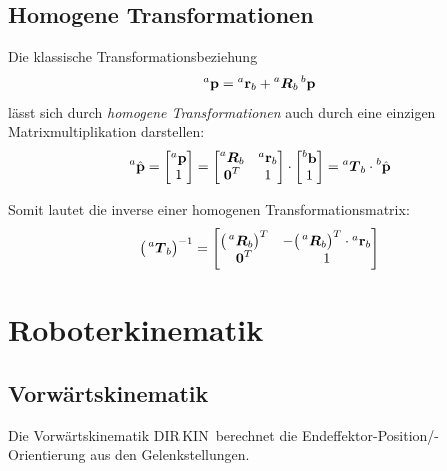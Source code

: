 \documentclass[a4paper, 11pt, accentcolor = tud3b]{tudreport}
\newcommand{\inreferenceto}[2]{\prescript{#1}{}{#2}}
\newcommand{\mat}[1]{\boldsymbol{#1}}
\renewcommand{\vec}[1]{\boldsymbol{\mathbf{#1}}}
\newcommand{\DIRKIN}{DIR\,KIN~}
\begin{document}
		\section{Homogene Transformationen} %
			Die klassische Transformationsbeziehung
			\begin{equation*}
				\inreferenceto{a}{\vec{p}} = \inreferenceto{a}{\vec{r}}_b + \inreferenceto{a}{\mat{R}}_b \inreferenceto{b}{\vec{p}}
			\end{equation*}
			lässt sich durch \emph{homogene Transformationen} auch durch eine einzigen Matrixmultiplikation darstellen:
			\begin{equation*}
				\inreferenceto{a}{\hat{\vec{p}}} =
					\begin{bmatrix}
						\inreferenceto{a}{\vec{p}} \\
						1
					\end{bmatrix}
				=
					\begin{bmatrix}
						\inreferenceto{a}{\mat{R}}_b & \inreferenceto{a}{\vec{r}}_b \\
						\vec{0}^T                    & 1
					\end{bmatrix}
				\cdot
					\begin{bmatrix}
						\inreferenceto{b}{\vec{b}} \\
						1
					\end{bmatrix}
				= \inreferenceto{a}{\mat{T}}_b \cdot \inreferenceto{b}{\hat{\vec{p}}}
			\end{equation*}

			Somit lautet die inverse einer homogenen Transformationsmatrix:
			\begin{equation*}
				\big(\inreferenceto{a}{\mat{T}}_b\big)^{-1} =
					\begin{bmatrix}
						\big(\inreferenceto{a}{\mat{R}}_b\big)^T & -\big(\inreferenceto{a}{\mat{R}}_b\big)^T \cdot \inreferenceto{a}{\vec{r}}_b \\
						\vec{0}^T                                & 1
					\end{bmatrix}
			\end{equation*}

	\chapter{Roboterkinematik}
		\section{Vorwärtskinematik}
			Die Vorwärtskinematik \DIRKIN berechnet die Endeffektor-Position/-Orientierung aus den Gelenkstellungen.
		
\end{document}
